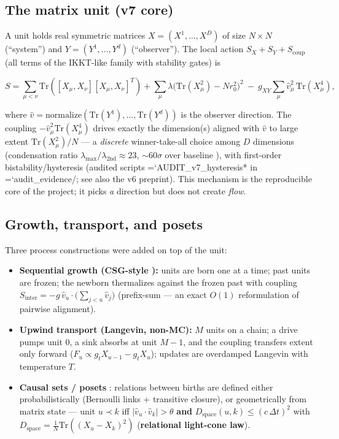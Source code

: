 \documentclass[12pt,a4paper]{article}
\providecommand{\tightlist}{%
  \setlength{\itemsep}{0pt}\setlength{\parskip}{0pt}}
\renewcommand{\texttt}[1]{{\ttfamily\hyphenchar\font=`\-\relax #1}}
\begin{document}
\subsection{The matrix unit (v7
core)}\label{the-matrix-unit-v7-core}

A unit holds real symmetric matrices \(X = (X^1,\dots,X^D)\) of size
\(N\times N\) (``system'') and \(Y = (Y^1,\dots,Y^d)\) (``observer'').
The local action \(S_X + S_Y + S_{\mathrm{coup}}\) (all terms of the
IKKT-like family \cite{ishibashi_kawai_kitazawa_tsuchiya_1997} with stability gates) is

\[S = \sum_{\mu<\nu}\mathrm{Tr}([X_\mu,X_\nu][X_\mu,X_\nu]^T) + \sum_\mu \lambda\big(\mathrm{Tr}(X_\mu^2)-Nr_0^2\big)^2 \ -\ g_{XY}\sum_\mu \hat v_\mu^2\,\mathrm{Tr}(X_\mu^4),\]

where
\(\hat v = \mathrm{normalize}(\mathrm{Tr}(Y^1),\dots,\mathrm{Tr}(Y^d))\)
is the observer direction. The coupling
\(-\hat v_\mu^2\mathrm{Tr}(X_\mu^4)\) drives exactly the dimension(s)
aligned with \(\hat v\) to large extent \(\mathrm{Tr}(X_\mu^2)/N\) --- a
\emph{discrete} winner-take-all choice among \(D\) dimensions
(condensation ratio \(\lambda_{\max}/\lambda_{2\mathrm{nd}}\approx 23\),
\(\sim 60\sigma\) over baseline \cite{chanpengpad_sgoed_v2}), with
first-order bistability/hysteresis (audited scripts
\texttt{AUDIT\_v7\_hysteresis*} in \texttt{audit\_evidence/}; see also
the v6 preprint). This mechanism is the reproducible core of the
project; it picks \emph{a} direction but does not create \emph{flow}.

\subsection{Growth, transport, and
posets}\label{growth-transport-and-posets}

Three process constructions were added on top of the unit:

\begin{itemize}
\tightlist
\item
  \textbf{Sequential growth (CSG-style \cite{rideout_sorkin_2000}):}
  units are born one at a time; past units are frozen; the newborn
  thermalizes against the frozen past with coupling
  \(S_{\mathrm{inter}} = -g\,\hat v_u\cdot \big(\sum_{j<u}\hat v_j\big)\)
  (prefix-sum --- an exact \(O(1)\) reformulation of pairwise
  alignment).
\item
  \textbf{Upwind transport (Langevin, non-MC):} \(M\) units on a chain;
  a drive pumps unit \(0\), a sink absorbs at unit \(M-1\), and the
  coupling transfers extent only forward
  (\(F_u \propto g_t X_{u-1} - g_t X_u\)); updates are overdamped
  Langevin with temperature \(T\).
\item
  \textbf{Causal sets / posets} \cite{sorkin_2005}: relations
  between births are defined either probabilistically (Bernoulli links +
  transitive closure), or geometrically from matrix state --- unit
  \(u\prec k\) iff \(|\hat v_u\cdot \hat v_k|>\theta\) \textbf{and}
  \(D_{\mathrm{space}}(u,k)\le (c\,\Delta t)^2\) with
  \(D_{\mathrm{space}} = \frac{1}{N}\mathrm{Tr}((X_u-X_k)^2)\)
  (\textbf{relational light-cone law}).
\end{itemize}
\end{document}

